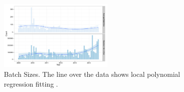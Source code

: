 \begin{figure}[ht]
	\centering
		\includegraphics[width=0.5\textwidth]{figures/batch_size}
	\caption{Batch Sizes. The line over the data shows local polynomial regression fitting \cite{cleveland1992local}.}
	\label{fig:batch_size}
\end{figure}


